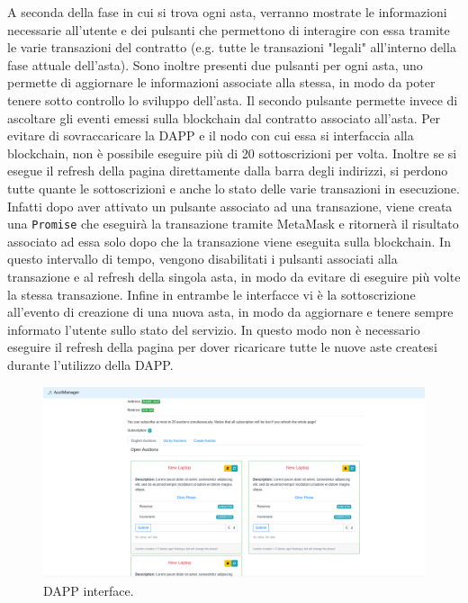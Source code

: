 A seconda della fase in cui si trova ogni asta, verranno mostrate le informazioni necessarie all'utente e dei pulsanti che permettono di interagire con essa tramite le varie transazioni del contratto (e.g. tutte le transazioni "legali" all'interno della fase attuale dell'asta). Sono inoltre presenti due pulsanti per ogni asta, uno permette di aggiornare le informazioni associate alla stessa, in modo da poter tenere sotto controllo lo sviluppo dell'asta. Il secondo pulsante permette invece di ascoltare gli eventi emessi sulla blockchain dal contratto associato all'asta. Per evitare di sovraccaricare la DAPP e il nodo con cui essa si interfaccia alla blockchain, non è possibile eseguire più di 20 sottoscrizioni per volta. Inoltre se si esegue il refresh della pagina direttamente dalla barra degli indirizzi, si perdono tutte quante le sottoscrizioni e anche lo stato delle varie transazioni in esecuzione.\newline
Infatti dopo aver attivato un pulsante associato ad una transazione, viene creata una \texttt{Promise} che eseguirà la transazione tramite MetaMask e ritornerà il risultato associato ad essa solo dopo che la transazione viene eseguita sulla blockchain. In questo intervallo di tempo, vengono disabilitati i pulsanti associati alla transazione e al refresh della singola asta, in modo da evitare di eseguire più volte la stessa transazione.\newline
Infine in entrambe le interfacce vi è la sottoscrizione all'evento di creazione di una nuova asta, in modo da aggiornare e tenere sempre informato l'utente sullo stato del servizio. In questo modo non è necessario eseguire il refresh della pagina per dover ricaricare tutte le nuove aste createsi durante l'utilizzo della DAPP.
\begin{figure}[h]
	\centering
	\includegraphics[scale=0.3]{interface.png}
	\caption{DAPP interface.}\label{fig1.3}
\end{figure}

